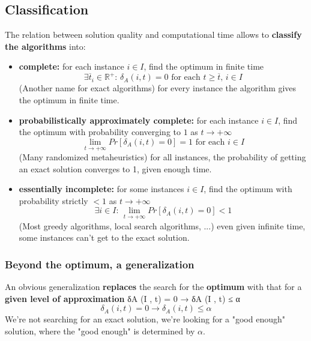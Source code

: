\newpage

\subsection{Classification}
The relation between solution quality and computational time allows to \textbf{classify the algorithms} into:
\begin{itemize}
	\item \textbf{complete:} for each instance $i \in I$, find the optimum in finite time
	$$ \exists \overline{t}_i \in \mathbb{R}^+ : \, \delta_A (i, t) = 0 \text{ for each } t \geq \overline{t}, \, i \in I $$
	(Another name for exact algorithms) for every instance the algorithm gives the optimum in finite time. \\
	
	\item \textbf{probabilistically approximately complete:} for each instance $i \in I$, find the optimum with probability converging to $1$ as $t \rightarrow + \infty$
	$$ \lim_{t \rightarrow + \infty} Pr \left[\delta_A (i, t) = 0\right] = 1 \text{ for each } i \in I $$
	(Many randomized metaheuristics) for all instances, the probability of getting an exact solution converges to 1, given enough time. \\
	
	\item \textbf{essentially incomplete:} for some instances $i \in I$, find the optimum with probability strictly $< 1$ as $t \rightarrow + \infty$
	$$ \exists i \in I: \, \lim_{t \rightarrow + \infty} Pr \left[\delta_A (i, t) = 0 \right] < 1 $$
	(Most greedy algorithms, local search algorithms, ...) even given infinite time, some instances can't get to the exact solution. \\
\end{itemize}

\newpage

\subsubsection{Beyond the optimum, a generalization}
An obvious generalization \textbf{replaces} the search for the \textbf{optimum} with that for a \textbf{given level of approximation}
δA (I , t) = 0 → δA (I , t) ≤ α
$$ \delta_A (i, t) = 0 \rightarrow \delta_A (i, t) \leq \alpha $$
We're not searching for an exact solution, we're looking for a "good enough" solution, where the "good enough" is determined by $\alpha$.\\

